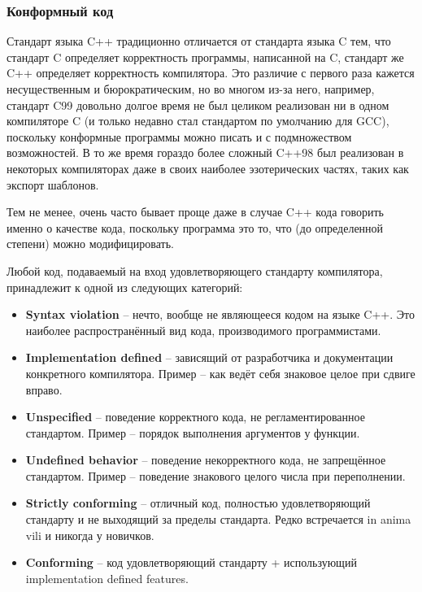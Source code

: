 \documentclass[a4paper,12pt,oneside]{article}
\begin{document}
\subsubsection{Конформный код}\label{ConformingCode}

Стандарт языка C++ традиционно отличается от стандарта языка C тем, что стандарт C определяет корректность программы, написанной на C, стандарт же C++ определяет корректность компилятора. Это различие с первого раза кажется несущественным и бюрократическим, но во многом из-за него, например, стандарт C99 довольно долгое время не был целиком реализован ни в одном компиляторе C (и только недавно стал стандартом по умолчанию для GCC), поскольку конформные программы можно писать и с подмножеством возможностей. В то же время гораздо более сложный C++98 был реализован в некоторых компиляторах даже в своих наиболее эзотерических частях, таких как экспорт шаблонов.

Тем не менее, очень часто бывает проще даже в случае C++ кода говорить именно о качестве кода, поскольку программа это то, что (до определенной степени) можно модифицировать.

Любой код, подаваемый на вход удовлетворяющего стандарту компилятора, принадлежит к одной из следующих категорий:

\begin{itemize}
\item \textbf{Syntax violation} -- нечто, вообще не являющееся кодом на языке C++. Это наиболее распространённый вид кода, производимого программистами.

\item \textbf{Implementation defined} -- зависящий от разработчика и документации конкретного компилятора. Пример -- как ведёт себя знаковое целое при сдвиге вправо.

\item \textbf{Unspecified} -- поведение корректного кода, не регламентированное стандартом. Пример -- порядок выполнения аргументов у функции.

\item \textbf{Undefined behavior} -- поведение некорректного кода, не запрещённое стандартом. Пример – поведение знакового целого числа при переполнении.

\item \textbf{Strictly conforming} -- отличный код, полностью удовлетворяющий стандарту и не выходящий за пределы стандарта. Редко встречается in anima vili и никогда у новичков.

\item \textbf{Conforming} -- код удовлетворяющий стандарту + использующий implementation defined features.
\end{itemize}
\end{document}
